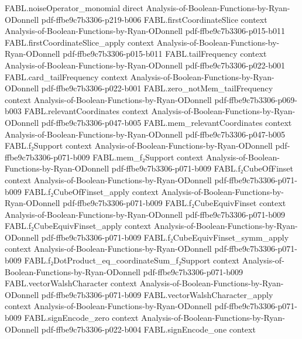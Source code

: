\begin{theorem}
  {FABL.noiseOperator_monomial}
  {direct}
  {Analysis-of-Boolean-Functions-by-Ryan-ODonnell}
  {pdf-ffbe9c7b3306-p219-b006}
\proofstep
  {FABL.firstCoordinateSlice}
  {context}
  {Analysis-of-Boolean-Functions-by-Ryan-ODonnell}
  {pdf-ffbe9c7b3306-p015-b011}
\proofstep
  {FABL.firstCoordinateSlice_apply}
  {context}
  {Analysis-of-Boolean-Functions-by-Ryan-ODonnell}
  {pdf-ffbe9c7b3306-p015-b011}
\proofstep
  {FABL.tailFrequency}
  {context}
  {Analysis-of-Boolean-Functions-by-Ryan-ODonnell}
  {pdf-ffbe9c7b3306-p022-b001}
\proofstep
  {FABL.card_tailFrequency}
  {context}
  {Analysis-of-Boolean-Functions-by-Ryan-ODonnell}
  {pdf-ffbe9c7b3306-p022-b001}
\proofstep
  {FABL.zero_notMem_tailFrequency}
  {context}
  {Analysis-of-Boolean-Functions-by-Ryan-ODonnell}
  {pdf-ffbe9c7b3306-p069-b003}
\proofstep
  {FABL.relevantCoordinates}
  {context}
  {Analysis-of-Boolean-Functions-by-Ryan-ODonnell}
  {pdf-ffbe9c7b3306-p047-b005}
\proofstep
  {FABL.mem_relevantCoordinates}
  {context}
  {Analysis-of-Boolean-Functions-by-Ryan-ODonnell}
  {pdf-ffbe9c7b3306-p047-b005}
\proofstep
  {FABL.f₂Support}
  {context}
  {Analysis-of-Boolean-Functions-by-Ryan-ODonnell}
  {pdf-ffbe9c7b3306-p071-b009}
\proofstep
  {FABL.mem_f₂Support}
  {context}
  {Analysis-of-Boolean-Functions-by-Ryan-ODonnell}
  {pdf-ffbe9c7b3306-p071-b009}
\proofstep
  {FABL.f₂CubeOfFinset}
  {context}
  {Analysis-of-Boolean-Functions-by-Ryan-ODonnell}
  {pdf-ffbe9c7b3306-p071-b009}
\proofstep
  {FABL.f₂CubeOfFinset_apply}
  {context}
  {Analysis-of-Boolean-Functions-by-Ryan-ODonnell}
  {pdf-ffbe9c7b3306-p071-b009}
\proofstep
  {FABL.f₂CubeEquivFinset}
  {context}
  {Analysis-of-Boolean-Functions-by-Ryan-ODonnell}
  {pdf-ffbe9c7b3306-p071-b009}
\proofstep
  {FABL.f₂CubeEquivFinset_apply}
  {context}
  {Analysis-of-Boolean-Functions-by-Ryan-ODonnell}
  {pdf-ffbe9c7b3306-p071-b009}
\proofstep
  {FABL.f₂CubeEquivFinset_symm_apply}
  {context}
  {Analysis-of-Boolean-Functions-by-Ryan-ODonnell}
  {pdf-ffbe9c7b3306-p071-b009}
\proofstep
  {FABL.f₂DotProduct_eq_coordinateSum_f₂Support}
  {context}
  {Analysis-of-Boolean-Functions-by-Ryan-ODonnell}
  {pdf-ffbe9c7b3306-p071-b009}
\proofstep
  {FABL.vectorWalshCharacter}
  {context}
  {Analysis-of-Boolean-Functions-by-Ryan-ODonnell}
  {pdf-ffbe9c7b3306-p071-b009}
\proofstep
  {FABL.vectorWalshCharacter_apply}
  {context}
  {Analysis-of-Boolean-Functions-by-Ryan-ODonnell}
  {pdf-ffbe9c7b3306-p071-b009}
\proofstep
  {FABL.signEncode_zero}
  {context}
  {Analysis-of-Boolean-Functions-by-Ryan-ODonnell}
  {pdf-ffbe9c7b3306-p022-b004}
\proofstep
  {FABL.signEncode_one}
  {context}

\end{theorem}
